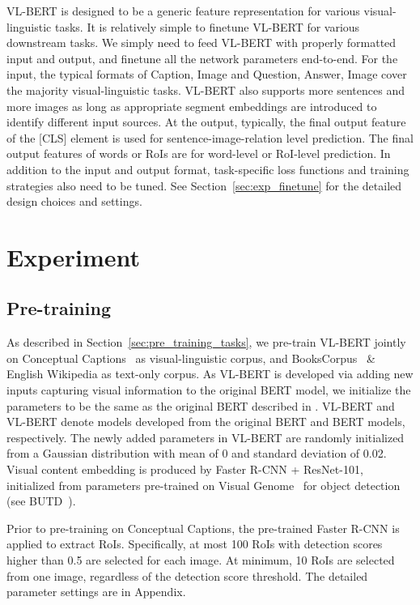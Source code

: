 \documentclass{article} \usepackage{iclr2020_conference,times}
\begin{document}
VL-BERT is designed to be a generic feature representation for various visual-linguistic tasks. It is relatively simple to finetune VL-BERT for various downstream tasks. We simply need to feed VL-BERT with properly formatted input and output, and finetune all the network parameters end-to-end. For the input, the typical formats of Caption, Image and Question, Answer, Image cover the majority visual-linguistic tasks. VL-BERT also supports more sentences and more images as long as appropriate segment embeddings are introduced to identify different input sources. At the output, typically, the final output feature of the [CLS] element is used for sentence-image-relation level prediction. The final output features of words or RoIs are for word-level or RoI-level prediction. In addition to the input and output format, task-specific loss functions and training strategies also need to be tuned. See Section~\ref{sec:exp_finetune} for the detailed design choices and settings.

 \section{Experiment}

\subsection{Pre-training}

As described in Section~\ref{sec:pre_training_tasks}, we pre-train VL-BERT jointly on Conceptual Captions~\citep{sharma2018conceptual} as visual-linguistic corpus, and BooksCorpus~\citep{zhu2015aligning} \& English Wikipedia as text-only corpus. As VL-BERT is developed via adding new inputs capturing visual information to the original BERT model, we initialize the parameters to be the same as the original BERT described in \citep{devlin2018bert}. VL-BERT and VL-BERT denote models developed from the original BERT and BERT models, respectively. The newly added parameters in VL-BERT are randomly initialized from a Gaussian distribution with mean of 0 and standard deviation of 0.02.  Visual content embedding is produced by Faster R-CNN + ResNet-101, initialized from parameters pre-trained on Visual Genome~\citep{krishna2017visual} for object detection (see BUTD~\citep{anderson2018bottom}).


Prior to pre-training on Conceptual Captions, the pre-trained Faster R-CNN is applied to extract RoIs. Specifically, at most 100 RoIs with detection scores higher than 0.5 are selected for each image. At minimum, 10 RoIs are selected from one image, regardless of the detection score threshold. The detailed parameter settings are in Appendix.
\end{document}
